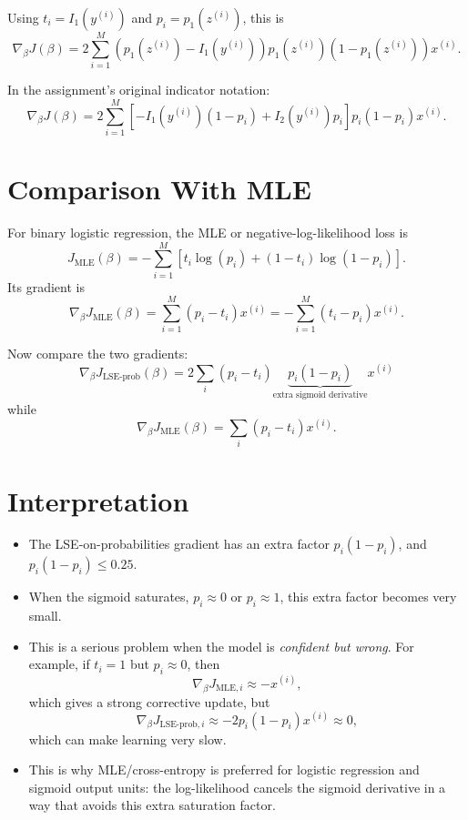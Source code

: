 \documentclass[11pt]{article}
\begin{document}
Using \(t_i=I_1(y^{(i)})\) and \(p_i=p_1(z^{(i)})\), this is
\[
    \boxed{
    \nabla_\beta J(\beta)
    =
    2\sum_{i=1}^{M}
    \left(p_1(z^{(i)})-I_1(y^{(i)})\right)
    p_1(z^{(i)})\left(1-p_1(z^{(i)})\right)x^{(i)}
    }.
\]

In the assignment's original indicator notation:
\[
    \boxed{
    \nabla_\beta J(\beta)
    =
    2\sum_{i=1}^{M}
    \left[
        -I_1(y^{(i)})(1-p_i)
        +
        I_2(y^{(i)})p_i
    \right]
    p_i(1-p_i)x^{(i)}
    }.
\]

\section*{Comparison With MLE}

For binary logistic regression, the MLE or negative-log-likelihood loss is
\[
    J_{\text{MLE}}(\beta)
    =
    -\sum_{i=1}^{M}
    \left[
        t_i\log(p_i)
        +
        (1-t_i)\log(1-p_i)
    \right].
\]
Its gradient is
\[
    \boxed{
    \nabla_\beta J_{\text{MLE}}(\beta)
    =
    \sum_{i=1}^{M}(p_i-t_i)x^{(i)}
    =
    -\sum_{i=1}^{M}(t_i-p_i)x^{(i)}
    }.
\]

Now compare the two gradients:
\[
    \nabla_\beta J_{\text{LSE-prob}}(\beta)
    =
    2\sum_i (p_i-t_i)\underbrace{p_i(1-p_i)}_{\text{extra sigmoid derivative}}x^{(i)}
\]
while
\[
    \nabla_\beta J_{\text{MLE}}(\beta)
    =
    \sum_i (p_i-t_i)x^{(i)}.
\]

\section*{Interpretation}

\begin{itemize}
    \item The LSE-on-probabilities gradient has an extra factor
    \(p_i(1-p_i)\), and \(p_i(1-p_i)\le 0.25\).
    \item When the sigmoid saturates, \(p_i\approx 0\) or \(p_i\approx 1\), this
    extra factor becomes very small.
    \item This is a serious problem when the model is \emph{confident but wrong}.
    For example, if \(t_i=1\) but \(p_i\approx 0\), then
    \[
        \nabla_\beta J_{\text{MLE},i}\approx -x^{(i)},
    \]
    which gives a strong corrective update, but
    \[
        \nabla_\beta J_{\text{LSE-prob},i}
        \approx
        -2p_i(1-p_i)x^{(i)}
        \approx 0,
    \]
    which can make learning very slow.
    \item This is why MLE/cross-entropy is preferred for logistic regression and
    sigmoid output units: the log-likelihood cancels the sigmoid derivative in a
    way that avoids this extra saturation factor.
\end{itemize}
\end{document}
